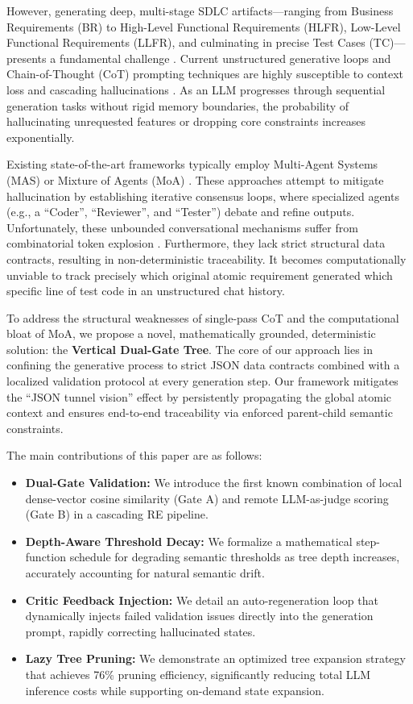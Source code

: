 \documentclass[journal]{IEEEtran}
\begin{document}
However, generating deep, multi-stage SDLC artifacts---ranging from Business Requirements (BR) to High-Level Functional Requirements (HLFR), Low-Level Functional Requirements (LLFR), and culminating in precise Test Cases (TC)---presents a fundamental challenge \cite{challenges_llm_re2024}. Current unstructured generative loops and Chain-of-Thought (CoT) prompting techniques are highly susceptible to context loss and cascading hallucinations \cite{cascading_hallucination2024}. As an LLM progresses through sequential generation tasks without rigid memory boundaries, the probability of hallucinating unrequested features or dropping core constraints increases exponentially.

Existing state-of-the-art frameworks typically employ Multi-Agent Systems (MAS) or Mixture of Agents (MoA) \cite{swe_agent2024, blueprint2code2025}. These approaches attempt to mitigate hallucination by establishing iterative consensus loops, where specialized agents (e.g., a ``Coder'', ``Reviewer'', and ``Tester'') debate and refine outputs. Unfortunately, these unbounded conversational mechanisms suffer from combinatorial token explosion \cite{agentcoder2023}. Furthermore, they lack strict structural data contracts, resulting in non-deterministic traceability. It becomes computationally unviable to track precisely which original atomic requirement generated which specific line of test code in an unstructured chat history.

To address the structural weaknesses of single-pass CoT and the computational bloat of MoA, we propose a novel, mathematically grounded, deterministic solution: the \textbf{Vertical Dual-Gate Tree}. The core of our approach lies in confining the generative process to strict JSON data contracts combined with a localized validation protocol at every generation step. Our framework mitigates the ``JSON tunnel vision'' effect by persistently propagating the global atomic context and ensures end-to-end traceability via enforced parent-child semantic constraints.

The main contributions of this paper are as follows:
\begin{itemize}
    \item \textbf{Dual-Gate Validation:} We introduce the first known combination of local dense-vector cosine similarity (Gate A) and remote LLM-as-judge scoring (Gate B) in a cascading RE pipeline.
    \item \textbf{Depth-Aware Threshold Decay:} We formalize a mathematical step-function schedule for degrading semantic thresholds as tree depth increases, accurately accounting for natural semantic drift.
    \item \textbf{Critic Feedback Injection:} We detail an auto-regeneration loop that dynamically injects failed validation issues directly into the generation prompt, rapidly correcting hallucinated states.
    \item \textbf{Lazy Tree Pruning:} We demonstrate an optimized tree expansion strategy that achieves 76\% pruning efficiency, significantly reducing total LLM inference costs while supporting on-demand state expansion.
\end{itemize}
\end{document}

